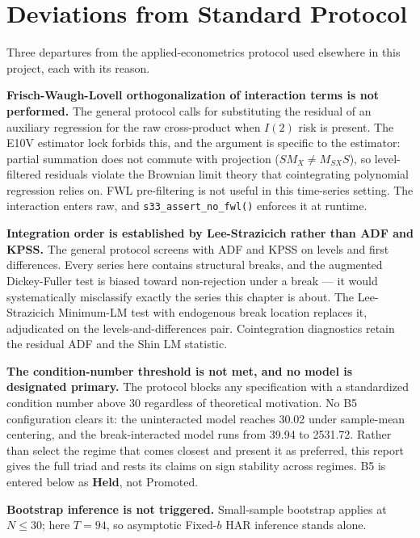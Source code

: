 \documentclass[11pt,a4paper]{article}
\begin{document}
\FloatBarrier
\section{Deviations from Standard Protocol}
\label{sec:deviations}

Three departures from the applied-econometrics protocol used elsewhere in this project, each with its reason.

\textbf{Frisch-Waugh-Lovell orthogonalization of interaction terms is not performed.} The general protocol calls for substituting the residual of an auxiliary regression for the raw cross-product when $I(2)$ risk is present. The E10V estimator lock forbids this, and the argument is specific to the estimator: partial summation does not commute with projection ($S M_X \neq M_{SX} S$), so level-filtered residuals violate the Brownian limit theory that cointegrating polynomial regression relies on. FWL pre-filtering is not useful in this time-series setting. The interaction enters raw, and \texttt{s33\_assert\_no\_fwl()} enforces it at runtime.

\textbf{Integration order is established by Lee-Strazicich rather than ADF and KPSS.} The general protocol screens with ADF and KPSS on levels and first differences. Every series here contains structural breaks, and the augmented Dickey-Fuller test is biased toward non-rejection under a break --- it would systematically misclassify exactly the series this chapter is about. The Lee-Strazicich Minimum-LM test with endogenous break location replaces it, adjudicated on the levels-and-differences pair. Cointegration diagnostics retain the residual ADF and the Shin LM statistic.

\textbf{The condition-number threshold is not met, and no model is designated primary.} The protocol blocks any specification with a standardized condition number above 30 regardless of theoretical motivation. No B5 configuration clears it: the uninteracted model reaches 30.02 under sample-mean centering, and the break-interacted model runs from 39.94 to 2531.72. Rather than select the regime that comes closest and present it as preferred, this report gives the full triad and rests its claims on sign stability across regimes. B5 is entered below as \textbf{Held}, not Promoted.

\textbf{Bootstrap inference is not triggered.} Small-sample bootstrap applies at $N \le 30$; here $T = 94$, so asymptotic Fixed-$b$ HAR inference stands alone.
\end{document}
